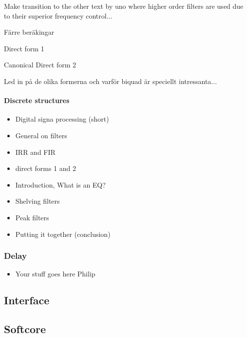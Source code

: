 \documentclass[12p]{article}
\begin{document}
Make transition to the other text by uno where higher order filters are used due to their superior frequency control...



Färre beräkingar

Direct form 1

Canonical Direct form 2

Led in på de olika formerna och varför biquad är speciellt intressanta...



\paragraph{Discrete structures}












\begin{itemize}
\item Digital signa processing (short)
\item General on filters
\item IRR and FIR
\item direct forms 1 and 2
\item Introduction, What is an EQ?
\item Shelving filters
\item Peak filters
\item Putting it together (conclusion)
\end{itemize}

\subsubsection{Delay}
\begin{itemize}
\item Your stuff goes here Philip
\end{itemize}

\subsection{Interface}
\label{Theory:Interface}

\subsection{Softcore}
\label{Theory:Softcore}
\end{document}
